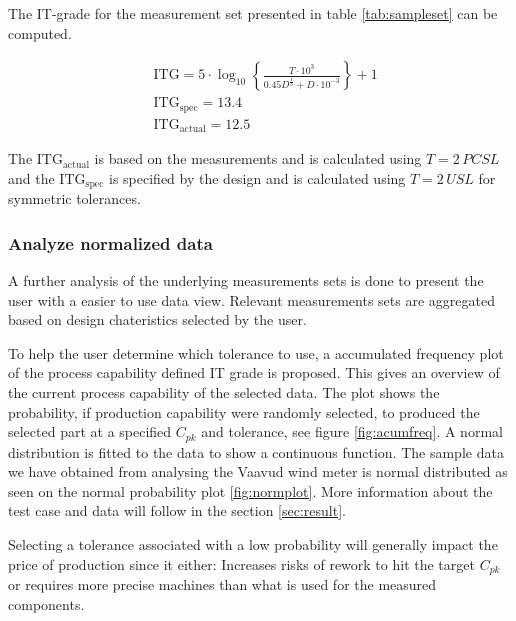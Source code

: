 \documentclass[aip,amsmath, reprint, author-year]{revtex4-1}
\begin{document}
The IT-grade for the measurement set presented in table \ref{tab:sampleset} can be computed.

\begin{align*}
&\mathrm{ITG} = 5 \cdot \log_{10} \left\{ \frac{T \cdot 10^3}{ 0.45  D^{\frac{1}{3}} + D \cdot10^{-3} }\right\} +1 \\
&\mathrm{ITG_{spec} }= 13.4 \\
&\mathrm{ITG_{actual}} = 12.5
\end{align*}

The $\mathrm{ITG_{actual}}$ is based on the measurements  and is calculated using $T = 2 \, PCSL$ and the $\mathrm{ITG_{spec}}$ is specified by the design and is calculated using $T = 2 \,USL$ for symmetric tolerances. 





\subsubsection{Analyze normalized data}
A further analysis of the underlying measurements sets is done to present the user with a easier to use data view. 
Relevant measurements sets are aggregated based on design chateristics selected by the user. 

To help the user determine which tolerance to use, a accumulated frequency plot of the process capability defined IT grade is proposed. 
This gives an overview of the current process capability of the selected data. The plot shows the probability, if production capability were randomly selected, to produced the selected part at a specified $C_{pk}$ and tolerance, see figure \ref{fig:acumfreq}. 
A normal distribution is fitted to the data to show a continuous function. 
The sample data we have obtained from analysing the Vaavud wind meter is normal distributed as seen on the normal probability plot \ref{fig:normplot}. 
More information about the test case and data will follow in the section \ref{sec:result}.

Selecting a tolerance associated with a low probability will generally impact the price of production since it either: 
Increases risks of rework to hit the target $C_{pk}$ or requires more precise machines than what is used for the measured components.
\end{document}
